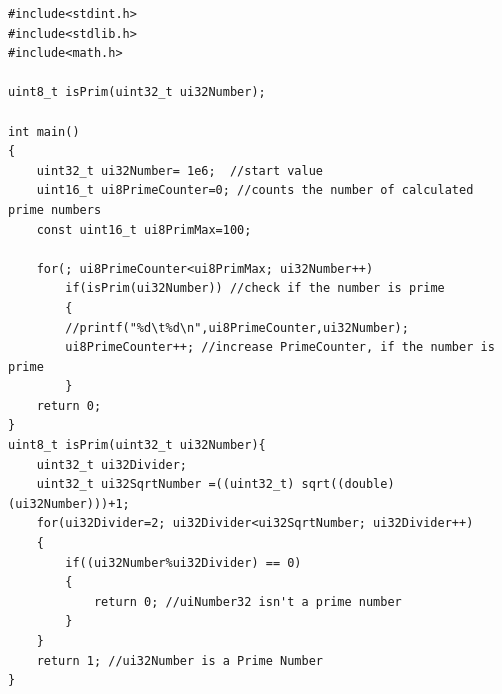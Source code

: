 \begin{lstlisting}[frame=htrbl, caption={Algorithmus zur Berechnung der ersten 100 Primzahlen größer als 1E6}, label={lst:Primzahlen}]
#include<stdint.h>
#include<stdlib.h>
#include<math.h>

uint8_t isPrim(uint32_t ui32Number);

int main()
{
	uint32_t ui32Number= 1e6;  //start value
	uint16_t ui8PrimeCounter=0; //counts the number of calculated prime numbers
	const uint16_t ui8PrimMax=100;

	for(; ui8PrimeCounter<ui8PrimMax; ui32Number++)
		if(isPrim(ui32Number)) //check if the number is prime
		{
		//printf("%d\t%d\n",ui8PrimeCounter,ui32Number);
		ui8PrimeCounter++; //increase PrimeCounter, if the number is prime
		}
	return 0;
}
uint8_t isPrim(uint32_t ui32Number){
	uint32_t ui32Divider;
	uint32_t ui32SqrtNumber =((uint32_t) sqrt((double)(ui32Number)))+1;
	for(ui32Divider=2; ui32Divider<ui32SqrtNumber; ui32Divider++)
	{
		if((ui32Number%ui32Divider) == 0)
		{
			return 0; //uiNumber32 isn't a prime number
		}
	}
	return 1; //ui32Number is a Prime Number
}
\end{lstlisting}

